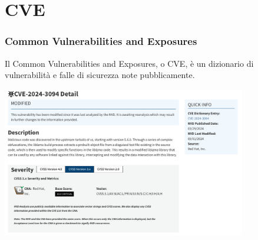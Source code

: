 
\section{CVE} %


\begin{frame}
\frametitle{Common Vulnerabilities and Exposures}
Il Common Vulnerabilities and Exposures, o CVE,
è un dizionario di vulnerabilità e falle di sicurezza note pubblicamente. 
\begin{center}
    \includegraphics[width=0.8\textwidth]{img/1-CVE/CVE.png}
\end{center}


\end{frame}

